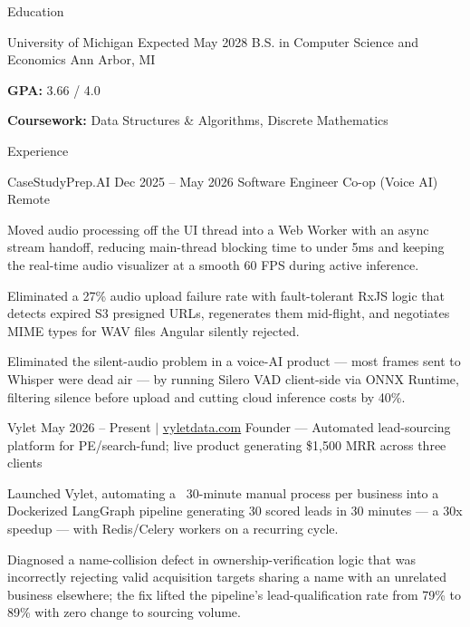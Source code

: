 \documentclass[
	11pt
]{../../../template}
\begin{document}
	\begin{rSection}{E}{ducation}
		\begin{rSectionEntry}
			{University of Michigan}
			{Expected May 2028}
			{B.S. in Computer Science and Economics}
			{}
			{Ann Arbor, MI}

			\item \textbf{GPA:} 3.66 / 4.0
			\item \textbf{Coursework:} Data Structures \& Algorithms, Discrete Mathematics
		\end{rSectionEntry}
	\end{rSection}

	\begin{rSection}{E}{xperience}
		\begin{rSectionEntry}
			{CaseStudyPrep.AI}
			{Dec 2025 -- May 2026}
			{Software Engineer Co-op (Voice AI)}
			{}
			{Remote}

			\item Moved audio processing off the UI thread into a Web Worker with an async stream handoff, reducing main-thread blocking time to under 5ms and keeping the real-time audio visualizer at a smooth 60 FPS during active inference.
			\item Eliminated a 27\% audio upload failure rate with fault-tolerant RxJS logic that detects expired S3 presigned URLs, regenerates them mid-flight, and negotiates MIME types for WAV files Angular silently rejected.
			\item Eliminated the silent-audio problem in a voice-AI product --- most frames sent to Whisper were dead air --- by running Silero VAD client-side via ONNX Runtime, filtering silence before upload and cutting cloud inference costs by 40\%.
		\end{rSectionEntry}

		\begin{rSectionEntry}
			{Vylet}
			{May 2026 -- Present $\vert$ \href{https://vyletdata.com}{vyletdata.com}}
			{Founder --- Automated lead-sourcing platform for PE/search-fund; live product generating \$1,500 MRR across three clients}
			{}
			{}

			\item Launched Vylet, automating a ~30-minute manual process per business into a Dockerized LangGraph pipeline generating 30 scored leads in 30 minutes --- a 30x speedup --- with Redis/Celery workers on a recurring cycle.
			\item Diagnosed a name-collision defect in ownership-verification logic that was incorrectly rejecting valid acquisition targets sharing a name with an unrelated business elsewhere; the fix lifted the pipeline's lead-qualification rate from 79\% to 89\% with zero change to sourcing volume.
		\end{rSectionEntry}


\end{rSection}
\end{document}
